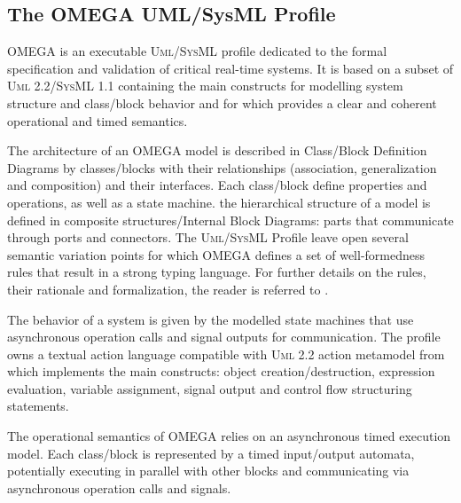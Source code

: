 \documentclass[a4paper,twoside]{article}
\def\sysml{\textsc{SysML}}
\def\uml{\textsc{Uml}}
\begin{document}
\subsection{The OMEGA UML/SysML Profile}

OMEGA is an executable \uml{}/\sysml{} profile dedicated to the formal specification and validation of critical real-time systems. It is based on a subset of \uml{} 2.2/\sysml{} 1.1 containing the main constructs for modelling system structure and class/block behavior and for which provides a clear and coherent operational and timed semantics.


The architecture of an OMEGA model is described in Class/Block Definition Diagrams by classes/blocks with their relationships (association, generalization and composition) and their interfaces. Each class/block define properties and operations, as well as a state machine. the hierarchical structure of a model is defined in composite structures/Internal Block Diagrams: parts that communicate through ports and connectors. The \uml{}/\sysml{} Profile leave open several semantic variation points for which OMEGA defines a set of well-formedness rules that result in a strong typing language. For further details on the rules, their rationale and formalization, the reader is referred to \cite{test11}.


The behavior of a system is given by the modelled state machines that use asynchronous operation calls and signal outputs for communication. The profile owns a textual action language compatible with \uml{} 2.2 action metamodel from which implements the main constructs: object creation/destruction, expression evaluation, variable assignment, signal output and control flow structuring statements.


The operational semantics of OMEGA relies on an asynchronous timed execution model. Each class/block is represented by a timed input/output automata, potentially executing in parallel with other blocks and communicating via asynchronous operation calls and signals. 
\end{document}
